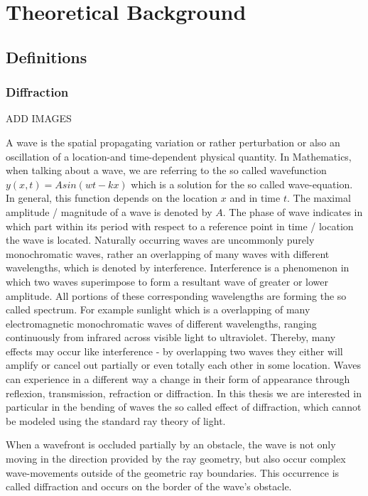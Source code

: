 \chapter{Theoretical Background}
\section{Definitions}
\subsection{Diffraction}
ADD IMAGES

A wave is the spatial propagating variation or rather perturbation or also an oscillation of a location-and time-dependent physical quantity. In Mathematics, when talking about a wave, we are referring to the so called wavefunction  $y(x,t) = A sin(wt - kx)$ which is a solution for the so called wave-equation. In general, this function depends on the location $x$ and in time $t$. The maximal amplitude / magnitude of a wave is denoted by $A$. The phase of wave indicates in which part within its period with respect to a reference point in time / location the wave is located.
Naturally occurring waves are uncommonly purely monochromatic waves, rather an overlapping of many waves with different wavelengths, which is denoted by interference. Interference  is a phenomenon in which two waves superimpose to form a resultant wave of greater or lower amplitude. All portions of these corresponding wavelengths are forming the so called spectrum. For example sunlight which is a overlapping of many electromagnetic monochromatic waves of different wavelengths, ranging continuously from infrared across visible light to ultraviolet. Thereby, many effects may occur like interference - by overlapping two waves they either will amplify or cancel out partially or even totally each other in some location.
Waves can experience in a different way a change in their form of appearance through reflexion, transmission, refraction or diffraction. In this thesis we are interested in particular in the bending of waves the so called effect of diffraction, which cannot be modeled using the standard ray theory of light.

When a wavefront is occluded partially by an obstacle, the wave is not only moving in the direction provided by the ray geometry, but also occur complex wave-movements outside of the geometric ray boundaries. This occurrence is called diffraction and occurs on the border of the wave's obstacle. 


